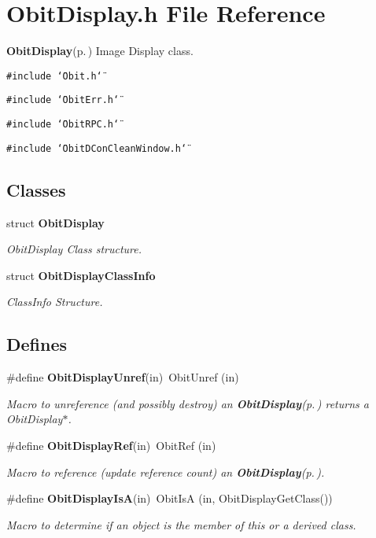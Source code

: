 \section{Obit\-Display.h File Reference}
\label{ObitDisplay_8h}
{\bf Obit\-Display}{\rm (p.\,\pageref{structObitDisplay})} Image Display class. 

{\tt \#include \char`\"{}Obit.h\char`\"{}}\par
{\tt \#include \char`\"{}Obit\-Err.h\char`\"{}}\par
{\tt \#include \char`\"{}Obit\-RPC.h\char`\"{}}\par
{\tt \#include \char`\"{}Obit\-DCon\-Clean\-Window.h\char`\"{}}\par
\subsection*{Classes}
\begin{CompactItemize}
\item 
struct {\bf Obit\-Display}
\begin{CompactList}\small\item\em Obit\-Display Class structure. \item\end{CompactList}\item 
struct {\bf Obit\-Display\-Class\-Info}
\begin{CompactList}\small\item\em Class\-Info Structure. \item\end{CompactList}\end{CompactItemize}
\subsection*{Defines}
\begin{CompactItemize}
\item 
\#define {\bf Obit\-Display\-Unref}(in)\ Obit\-Unref (in)
\begin{CompactList}\small\item\em Macro to unreference (and possibly destroy) an {\bf Obit\-Display}{\rm (p.\,\pageref{structObitDisplay})} returns a Obit\-Display$\ast$. \item\end{CompactList}\item 
\#define {\bf Obit\-Display\-Ref}(in)\ Obit\-Ref (in)
\begin{CompactList}\small\item\em Macro to reference (update reference count) an {\bf Obit\-Display}{\rm (p.\,\pageref{structObitDisplay})}. \item\end{CompactList}\item 
\#define {\bf Obit\-Display\-Is\-A}(in)\ Obit\-Is\-A (in, Obit\-Display\-Get\-Class())
\begin{CompactList}\small\item\em Macro to determine if an object is the member of this or a derived class. \item\end{CompactList}\end{CompactItemize}
